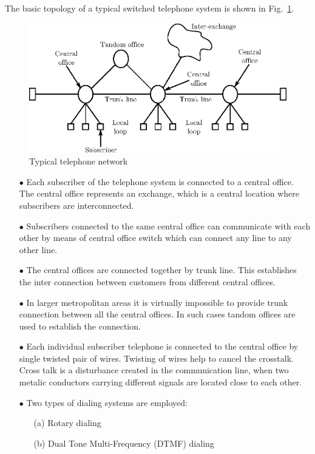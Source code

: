 The basic topology of a typical switched telephone system is shown in Fig.~\ref{fig10.1}.
\begin{figure}[H]
\centering
\includegraphics[scale=.94]{chap10/fig10.1.eps}
\caption{Typical telephone network}\label{fig10.1}
\end{figure}
\begin{itemize}
\item[$\bullet$] Each subscriber of the telephone system is connected to a central office. The central office represents an exchange, which is a central location where subscribers are interconnected.

\item[$\bullet$] Subscribers connected to the same central office can communicate with each other by means of central office switch which can connect any line to any other line.

\item[$\bullet$] The central offices are connected together by trunk line. This establishes the inter connection between customers from different central offices.

\item[$\bullet$] In larger metropolitan areas it is virtually impossible to provide trunk connection between all the central offices. In such cases tandom offices are used to establish the connection.

\item[$\bullet$] Each individual subscriber telephone is connected to the central office by single twisted pair of wires. Twisting of wires help to cancel the crosstalk. Cross talk is a disturbance created in the communication line, when two metalic conductors carrying different signals are located close to each other.

\item[$\bullet$] Two types of dialing systems are employed:
\begin{itemize}
\item[(a)] Rotary dialing

\item[(b)] Dual Tone Multi-Frequency (DTMF) dialing
\end{itemize}
\end{itemize}

